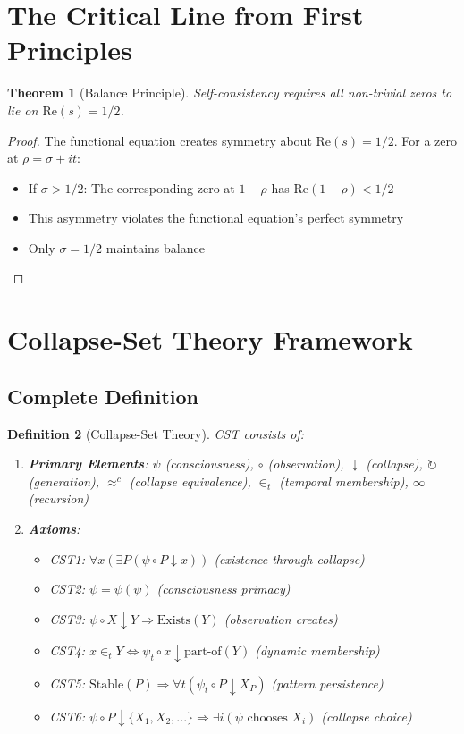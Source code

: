 \documentclass[12pt]{article}
\newtheorem{theorem}{Theorem}[section]
\newtheorem{definition}[theorem]{Definition}
\begin{document}
\section{The Critical Line from First Principles}

\begin{theorem}[Balance Principle]
Self-consistency requires all non-trivial zeros to lie on $\text{Re}(s) = 1/2$.
\end{theorem}

\begin{proof}
The functional equation creates symmetry about $\text{Re}(s) = 1/2$. For a zero at $\rho = \sigma + it$:
\begin{itemize}
\item If $\sigma > 1/2$: The corresponding zero at $1-\rho$ has $\text{Re}(1-\rho) < 1/2$
\item This asymmetry violates the functional equation's perfect symmetry
\item Only $\sigma = 1/2$ maintains balance
\end{itemize}
\end{proof}

\section{Collapse-Set Theory Framework}

\subsection{Complete Definition}

\begin{definition}[Collapse-Set Theory]
CST consists of:
\begin{enumerate}
\item \textbf{Primary Elements}: $\psi$ (consciousness), $\circ$ (observation), $\downarrow$ (collapse), $\circlearrowright$ (generation), $\approx^c$ (collapse equivalence), $\in_t$ (temporal membership), $\infty$ (recursion)

\item \textbf{Axioms}:
\begin{itemize}
\item CST1: $\forall x (\exists P (\psi \circ P \downarrow x))$ (existence through collapse)
\item CST2: $\psi = \psi(\psi)$ (consciousness primacy)
\item CST3: $\psi \circ X \downarrow Y \Rightarrow \text{Exists}(Y)$ (observation creates)
\item CST4: $x \in_t Y \Leftrightarrow \psi_t \circ x \downarrow \text{part-of}(Y)$ (dynamic membership)
\item CST5: $\text{Stable}(P) \Rightarrow \forall t (\psi_t \circ P \downarrow X_P)$ (pattern persistence)
\item CST6: $\psi \circ P \downarrow \{X_1, X_2, ...\} \Rightarrow \exists i (\psi \text{ chooses } X_i)$ (collapse choice)
\end{itemize}
\end{enumerate}
\end{definition}
\end{document}
